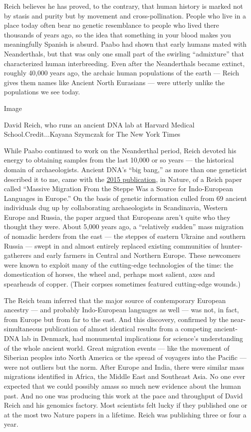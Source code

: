 Reich believes he has proved, to the contrary, that human history is
marked not by stasis and purity but by movement and cross-pollination.
People who live in a place today often bear no genetic resemblance to
people who lived there thousands of years ago, so the idea that
something in your blood makes you meaningfully Spanish is absurd. Paabo
had shown that early humans mated with Neanderthals, but that was only
one small part of the swirling ``admixture'' that characterized human
interbreeding. Even after the Neanderthals became extinct, roughly
40,000 years ago, the archaic human populations of the earth --- Reich
gives them names like Ancient North Eurasians --- were utterly unlike
the populations we see today.

Image

David Reich, who runs an ancient DNA lab at Harvard Medical
School.Credit...Kayana Szymczak for The New York Times

While Paabo continued to work on the Neanderthal period, Reich devoted
his energy to obtaining samples from the last 10,000 or so years --- the
historical domain of archaeologists. Ancient DNA's ``big bang,'' as more
than one geneticist described it to me, came with the
\href{https://www.nature.com/articles/nature14317}{2015 publication}, in
Nature, of a Reich paper called ``Massive Migration From the Steppe Was
a Source for Indo-European Languages in Europe.'' On the basis of
genetic information culled from 69 ancient individuals dug up by
collaborating archaeologists in Scandinavia, Western Europe and Russia,
the paper argued that Europeans aren't quite who they thought they were.
About 5,000 years ago, a ``relatively sudden'' mass migration of nomadic
herders from the east --- the steppes of eastern Ukraine and southern
Russia --- swept in and almost entirely replaced existing communities of
hunter-gatherers and early farmers in Central and Northern Europe. These
newcomers were known to exploit many of the cutting-edge technologies of
the time: the domestication of horses, the wheel and, perhaps most
salient, axes and spearheads of copper. (Their corpses sometimes
featured cutting-edge wounds.)

The Reich team inferred that the major source of contemporary European
ancestry --- and probably Indo-European languages as well --- was not,
in fact, from Europe but from far to the east. And this discovery,
confirmed by the near-simultaneous publication of almost identical
results from a competing ancient-DNA lab in Denmark, had monumental
implications for science's understanding of the whole ancient world.
Great migration events --- like the movement of Siberian peoples into
North America or the spread of voyagers into the Pacific --- were not
outliers but the norm. After Europe and India, there were similar mass
migrations identified in Africa, the Middle East and Southeast Asia. No
one ever expected that we could possibly amass so much new evidence
about the human past. And no one was producing this work at the pace and
throughput of David Reich and his genomics factory. Most scientists felt
lucky if they published one or at the most two Nature papers in a
lifetime. Reich was publishing three or four a year.

